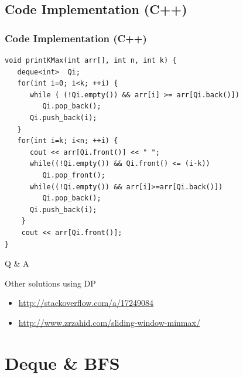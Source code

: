 \documentclass{beamer}
\begin{document}
\subsection{ Code Implementation (C++) }
\begin{frame}[fragile]
\frametitle{ Code Implementation (C++) }
\begin{example}[ C++ Implementation ]
\begin{lstlisting}
void printKMax(int arr[], int n, int k) {
   deque<int>  Qi;
   for(int i=0; i<k; ++i) {
      while ( (!Qi.empty()) && arr[i] >= arr[Qi.back()])
         Qi.pop_back();
      Qi.push_back(i);
   }
   for(int i=k; i<n; ++i) {
      cout << arr[Qi.front()] << " ";
      while((!Qi.empty()) && Qi.front() <= (i-k))
         Qi.pop_front();
      while((!Qi.empty()) && arr[i]>=arr[Qi.back()])
         Qi.pop_back();
      Qi.push_back(i);
    }
    cout << arr[Qi.front()];
}
\end{lstlisting}
\end{example}
\end{frame}
\begin{frame}
\Huge{\centerline{ Q \& A }}
\normalsize
\begin{block}{Other solutions using DP}
\begin{itemize}
	\item \url{http://stackoverflow.com/a/17249084}
	\item \url{http://www.zrzahid.com/sliding-window-minmax/}
\end{itemize}
\end{block}
\end{frame}
\section{ Deque \& BFS}
\end{document}
